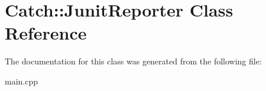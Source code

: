 \hypertarget{class_catch_1_1_junit_reporter}{}\section{Catch\+:\+:Junit\+Reporter Class Reference}
\label{class_catch_1_1_junit_reporter}


The documentation for this class was generated from the following file\+:\begin{DoxyCompactItemize}
\item 
main.\+cpp\end{DoxyCompactItemize}
